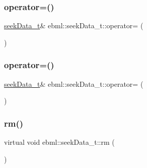 \mbox{\label{classebml_1_1seekData__t_a9ecc0247b6026b2cfd055b302a620166}} 
\subsubsection{\texorpdfstring{operator=()}{operator=()}\hspace{0.1cm}{\footnotesize\ttfamily [1/2]}}
{\footnotesize\ttfamily \mbox{\hyperlink{classebml_1_1seekData__t}{seek\+Data\+\_\+t}}\& ebml\+::seek\+Data\+\_\+t\+::operator= (\begin{DoxyParamCaption}\item[{const \mbox{\hyperlink{classebml_1_1seekData__t}{seek\+Data\+\_\+t}} \&}]{ }\end{DoxyParamCaption})}

\mbox{\label{classebml_1_1seekData__t_a7e1b55089fe090b9c2412f140411e2c3}} 
\subsubsection{\texorpdfstring{operator=()}{operator=()}\hspace{0.1cm}{\footnotesize\ttfamily [2/2]}}
{\footnotesize\ttfamily \mbox{\hyperlink{classebml_1_1seekData__t}{seek\+Data\+\_\+t}}\& ebml\+::seek\+Data\+\_\+t\+::operator= (\begin{DoxyParamCaption}\item[{\mbox{\hyperlink{classebml_1_1seekData__t}{seek\+Data\+\_\+t}} \&\&}]{ }\end{DoxyParamCaption})}

\mbox{\label{classebml_1_1seekData__t_a1f0da8c547bc52496bc4716ec732d138}} 
\subsubsection{\texorpdfstring{rm()}{rm()}}
{\footnotesize\ttfamily virtual void ebml\+::seek\+Data\+\_\+t\+::rm (\begin{DoxyParamCaption}\item[{std\+::unordered\+\_\+map$<$ \mbox{\hyperlink{namespaceebml_a86c5f604ddf12a74aa9812e997a58691}{ebml\+I\+D\+\_\+t}}, std\+::unique\+\_\+ptr$<$ \mbox{\hyperlink{classebml_1_1seekMapBase}{seek\+Map\+Base}} $>$$>$ \&}]{ }\end{DoxyParamCaption})\hspace{0.3cm}{\ttfamily [virtual]}}



